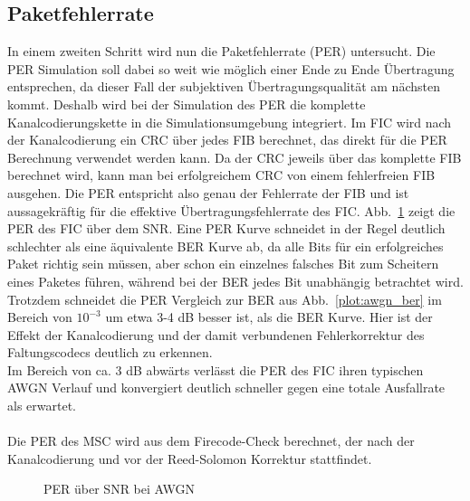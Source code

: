 \subsection{Paketfehlerrate}
In einem zweiten Schritt wird nun die Paketfehlerrate (PER) untersucht. Die PER Simulation soll dabei so weit wie möglich einer Ende zu Ende Übertragung entsprechen, da dieser Fall der subjektiven Übertragungsqualität am nächsten kommt. Deshalb wird bei der Simulation des PER die komplette Kanalcodierungskette in die Simulationsumgebung integriert.
Im FIC wird nach der Kanalcodierung ein CRC über jedes FIB berechnet, das direkt für die PER Berechnung verwendet werden kann. Da der CRC jeweils über das komplette FIB berechnet wird, kann man bei erfolgreichem CRC von einem fehlerfreien FIB ausgehen. Die PER entspricht also genau der Fehlerrate der FIB und ist aussagekräftig für die effektive Übertragungsfehlerrate des FIC. Abb.~\ref{plot:awgn_per} zeigt die PER des FIC über dem SNR. Eine PER Kurve schneidet in der Regel deutlich schlechter als eine äquivalente BER Kurve ab, da alle Bits für ein erfolgreiches Paket richtig sein müssen, aber schon ein einzelnes falsches Bit zum Scheitern eines Paketes führen, während bei der BER jedes Bit unabhängig betrachtet wird. Trotzdem schneidet die PER Vergleich zur BER aus Abb.~\ref{plot:awgn_ber} im Bereich von $10^{-3}$ um etwa 3-4 dB besser ist, als die BER Kurve. Hier ist der Effekt der Kanalcodierung und der damit verbundenen Fehlerkorrektur des Faltungscodecs deutlich zu erkennen. \\
Im Bereich von ca. 3 dB abwärts verlässt die PER des FIC ihren typischen AWGN Verlauf und konvergiert deutlich schneller gegen eine totale Ausfallrate als erwartet.
\\
\\
Die PER des MSC wird aus dem Firecode-Check berechnet, der nach der Kanalcodierung und vor der Reed-Solomon Korrektur stattfindet.

\begin{figure}[htb]
\begin{center}
\end{center}
\caption{PER über SNR bei AWGN}
\label{plot:awgn_per}
\end{figure}

